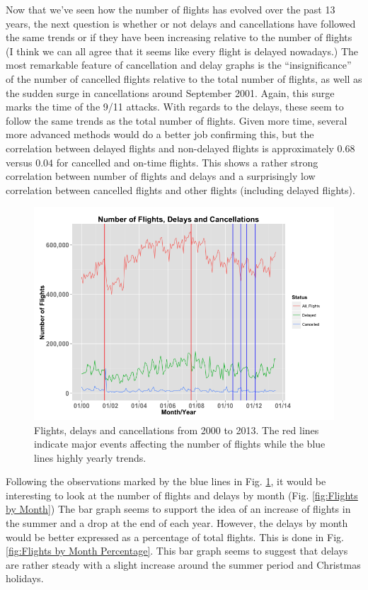 \documentclass[11pt,twoside,titlepage]{article}
\begin{document}
Now that we've seen how the number of flights has evolved over the past 13 years, the next question is whether or not delays and cancellations have followed the same trends or if they have been increasing relative to the number of flights (I think we can all agree that it seems like every flight is delayed nowadays.) The most remarkable feature of cancellation and delay graphs is the ``insignificance'' of the number of cancelled flights relative to the total number of flights, as well as the sudden surge in cancellations around September 2001. Again, this surge marks the time of the 9/11 attacks. With regards to the delays, these seem to follow the same trends as the total number of flights. Given more time, several more advanced methods would do a better job confirming this, but the correlation between delayed flights and non-delayed flights is approximately $0.68$ versus $0.04$ for cancelled and on-time flights. This shows a rather strong correlation between number of flights and delays and a surprisingly low correlation between cancelled flights and other flights (including delayed flights).

\begin{figure}[h!]
        \centering
                \includegraphics[width=16cm]{Number_of_Flights2.png}
        \caption{Flights, delays and cancellations from 2000 to 2013. The red lines indicate major events affecting the number of flights while the blue lines highly yearly trends.}\label{fig:Number of Flights + Delays}
\end{figure}

Following the observations marked by the blue lines in Fig. \ref{fig:Number of Flights + Delays}, it would be interesting to look at the number of flights and delays by month (Fig. \ref{fig:Flights by Month}) The bar graph seems to support the idea of an increase of flights in the summer and a drop at the end of each year. However, the delays by month would be better expressed as a percentage of total flights. This is done in Fig. \ref{fig:Flights by Month Percentage}. This bar graph seems to suggest that delays are rather steady with a slight increase around the summer period and Christmas holidays.
\end{document}
